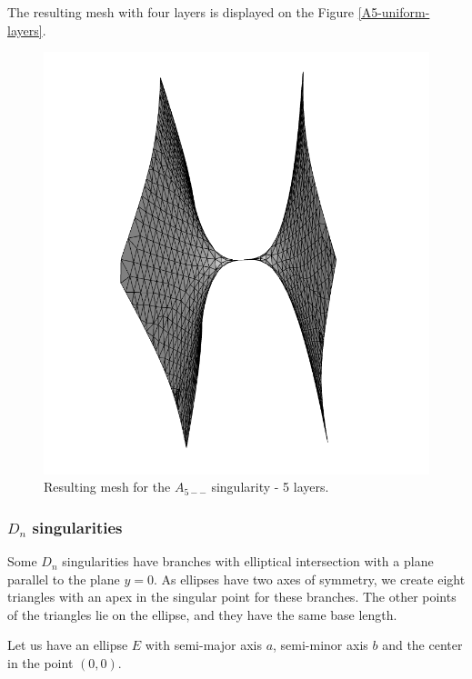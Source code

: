 The resulting mesh with four layers is displayed on the
Figure \ref{A5-uniform-layers}.
\begin{figure}
    \centerline{\includegraphics[scale=0.25]{images/A5-uniform-layers}}
    \caption[Resulting mesh for the $A_{5--}$ singularity]
    {Resulting mesh for the $A_{5--}$ singularity - 5 layers.}
    \label{img:A5-uniform-layers}
\end{figure}

\subsubsection*{$D_n$ singularities}
Some $D_n$ singularities have branches with elliptical intersection with 
a plane parallel to the plane $y=0$. As ellipses have two axes of symmetry,
we create eight triangles with an apex in the singular point for these branches.
The other points of the triangles lie on the ellipse, and they have the same base length.

Let us have an ellipse $E$ with semi-major axis $a$, semi-minor axis $b$ 
and the center in the point $(0, 0)$.

